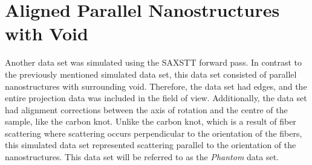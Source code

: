 


\section{Aligned Parallel Nanostructures with Void}
\label{sec:aligned_parallel_nanostructures_in_air}
Another data set was simulated using the SAXSTT forward pass. In contrast to the previously mentioned simulated data set,
this data set consisted of parallel nanostructures with surrounding void. Therefore, the data set had edges, and the entire projection data was included in the field of view.
Additionally, the data set had alignment corrections between the axis of rotation and the centre of the sample, like the carbon knot.
Unlike the carbon knot, which is a result of fiber scattering where scattering occurs perpendicular to the orientation of the fibers,
this simulated data set represented scattering parallel to the orientation of the nanostructures.
This data set will be referred to as the \emph{Phantom} data set.



